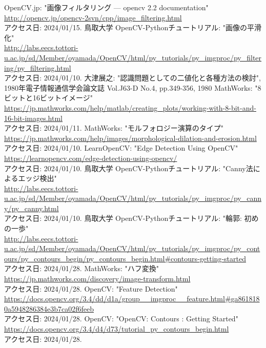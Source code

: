 \documentclass[uplatex, report, a4j, 10pt]{jsbook}
\begin{document}
\begin{thebibliography}{0}
  OpenCV.jp: "画像フィルタリング — opencv 2.2 documentation"\\\url{http://opencv.jp/opencv-2svn/cpp/image_filtering.html}\\アクセス日: 2024/01/15.
  鳥取大学 OpenCV-Pythonチュートリアル: "画像の平滑化"\\\url{http://labs.eecs.tottori-u.ac.jp/sd/Member/oyamada/OpenCV/html/py_tutorials/py_imgproc/py_filtering/py_filtering.html}\\アクセス日: 2024/01/10.
  大津展之: "認識問題としての二値化と各種方法の検討", 1980年電子情報通信学会論文誌 Vol.J63-D No.4, pp.349-356, 1980
  MathWorks: "8ビットと16ビットイメージ"\\\url{https://jp.mathworks.com/help/matlab/creating_plots/working-with-8-bit-and-16-bit-images.html}\\アクセス日: 2024/01/11.
  MathWorks: "モルフォロジー演算のタイプ"\\\url{https://jp.mathworks.com/help/images/morphological-dilation-and-erosion.html}\\アクセス日: 2024/01/10.
  LearnOpenCV: "Edge Detection Using OpenCV"\\\url{https://learnopencv.com/edge-detection-using-opencv/}\\アクセス日: 2024/01/10.
  鳥取大学 OpenCV-Pythonチュートリアル: "Canny法によるエッジ検出"\\\url{http://labs.eecs.tottori-u.ac.jp/sd/Member/oyamada/OpenCV/html/py_tutorials/py_imgproc/py_canny/py_canny.html}\\アクセス日: 2024/01/10.
  鳥取大学 OpenCV-Pythonチュートリアル: "輪郭: 初めの一歩"\\\url{http://labs.eecs.tottori-u.ac.jp/sd/Member/oyamada/OpenCV/html/py_tutorials/py_imgproc/py_contours/py_contours_begin/py_contours_begin.html#contours-getting-started}\\アクセス日: 2024/01/28.
  MathWorks: "ハフ変換"\\\url{https://jp.mathworks.com/discovery/image-transform.html}\\アクセス日: 2024/01/28.
  OpenCV: "Feature Detection"\\\url{https://docs.opencv.org/3.4/dd/d1a/group__imgproc__feature.html#ga8618180a5948286384e3b7ca02f6feeb}\\アクセス日: 2024/01/28.
  OpenCV: "OpenCV: Contours : Getting Started"\\\url{https://docs.opencv.org/3.4/d4/d73/tutorial_py_contours_begin.html}\\アクセス日: 2024/01/28.

\end{thebibliography}
\end{document}
